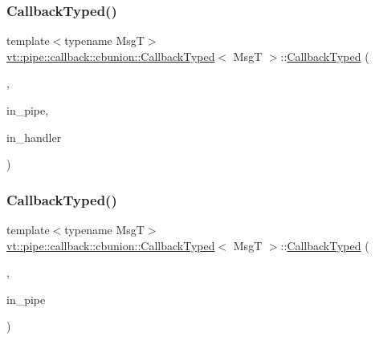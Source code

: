 \subsubsection{\texorpdfstring{Callback\+Typed()}{CallbackTyped()}\hspace{0.1cm}{\footnotesize\ttfamily [5/14]}}
{\footnotesize\ttfamily template$<$typename MsgT$>$ \\
\hyperlink{structvt_1_1pipe_1_1callback_1_1cbunion_1_1_callback_typed}{vt\+::pipe\+::callback\+::cbunion\+::\+Callback\+Typed}$<$ MsgT $>$\+::\hyperlink{structvt_1_1pipe_1_1callback_1_1cbunion_1_1_callback_typed}{Callback\+Typed} (\begin{DoxyParamCaption}\item[{Raw\+Bcast\+Msg\+Tag\+Type}]{,  }\item[{\hyperlink{namespacevt_ac9852acda74d1896f48f406cd72c7bd3}{Pipe\+Type} const \&}]{in\+\_\+pipe,  }\item[{\hyperlink{namespacevt_af64846b57dfcaf104da3ef6967917573}{Handler\+Type} const}]{in\+\_\+handler }\end{DoxyParamCaption})\hspace{0.3cm}{\ttfamily [inline]}}

\mbox{\label{structvt_1_1pipe_1_1callback_1_1cbunion_1_1_callback_typed_ac017bd9d99b889d882acb7e9847d0378}} 
\subsubsection{\texorpdfstring{Callback\+Typed()}{CallbackTyped()}\hspace{0.1cm}{\footnotesize\ttfamily [6/14]}}
{\footnotesize\ttfamily template$<$typename MsgT$>$ \\
\hyperlink{structvt_1_1pipe_1_1callback_1_1cbunion_1_1_callback_typed}{vt\+::pipe\+::callback\+::cbunion\+::\+Callback\+Typed}$<$ MsgT $>$\+::\hyperlink{structvt_1_1pipe_1_1callback_1_1cbunion_1_1_callback_typed}{Callback\+Typed} (\begin{DoxyParamCaption}\item[{Raw\+Anon\+Tag\+Type}]{,  }\item[{\hyperlink{namespacevt_ac9852acda74d1896f48f406cd72c7bd3}{Pipe\+Type} const \&}]{in\+\_\+pipe }\end{DoxyParamCaption})\hspace{0.3cm}{\ttfamily [inline]}}

